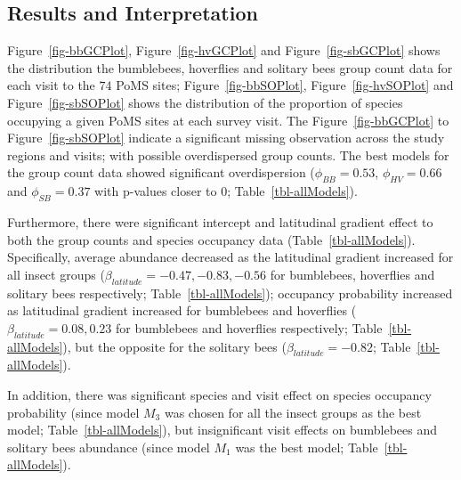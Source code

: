 \documentclass[
]{article}
\begin{document}
\hypertarget{results-and-interpretation}{%
\subsection{Results and
Interpretation}\label{results-and-interpretation}}

Figure~\ref{fig-bbGCPlot}, Figure~\ref{fig-hvGCPlot} and
Figure~\ref{fig-sbGCPlot} shows the distribution the bumblebees,
hoverflies and solitary bees group count data for each visit to the
\(74\) PoMS sites; Figure~\ref{fig-bbSOPlot}, Figure~\ref{fig-hvSOPlot}
and Figure~\ref{fig-sbSOPlot} shows the distribution of the proportion
of species occupying a given PoMS sites at each survey visit. The
Figure~\ref{fig-bbGCPlot} to Figure~\ref{fig-sbSOPlot} indicate a
significant missing observation across the study regions and visits;
with possible overdispersed group counts. The best models for the group
count data showed significant overdispersion (\(\phi_{BB} = 0.53\),
\(\phi_{HV} = 0.66\) and \(\phi_{SB} = 0.37\) with p-values closer to
\(0\); Table~\ref{tbl-allModels}).

Furthermore, there were significant intercept and latitudinal gradient
effect to both the group counts and species occupancy data
(Table~\ref{tbl-allModels}). Specifically, average abundance decreased
as the latitudinal gradient increased for all insect groups
(\(\beta_{latitude} = -0.47, -0.83, -0.56\) for bumblebees, hoverflies
and solitary bees respectively; Table~\ref{tbl-allModels}); occupancy
probability increased as latitudinal gradient increased for bumblebees
and hoverflies (\(\beta_{latitude} = 0.08, 0.23\) for bumblebees and
hoverflies respectively; Table~\ref{tbl-allModels}), but the opposite
for the solitary bees (\(\beta_{latitude} = -0.82\);
Table~\ref{tbl-allModels}).

In addition, there was significant species and visit effect on species
occupancy probability (since model \(M_3\) was chosen for all the insect
groups as the best model; Table~\ref{tbl-allModels}), but insignificant
visit effects on bumblebees and solitary bees abundance (since model
\(M_1\) was the best model; Table~\ref{tbl-allModels}).
\end{document}
